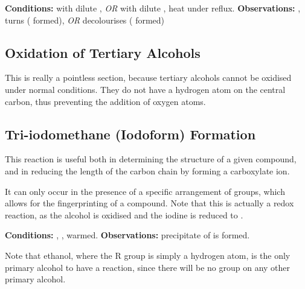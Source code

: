 			\vspace{1.5em}
			\vbox{\textbf{Conditions:}	\tabto{35mm} with dilute , \textit{OR}  with dilute ,
										\tabto{35mm}heat under reflux.}
			\vspace{0.75em}
			\vbox{\textbf{Observations:}\tabto{35mm} , turns 
													( formed), \textit{OR}
										\tabto{35mm}  decolourises ( formed)}



		\subsection{Oxidation of Tertiary Alcohols}

			This is really a pointless section, because tertiary alcohols cannot be oxidised under normal conditions. They do not have a hydrogen
			atom on the central carbon, thus preventing the addition of oxygen atoms.


		\pagebreak
		\subsection{Tri-iodomethane (Iodoform) Formation}

			This reaction is useful both in determining the structure of a given compound, and in reducing the length of the carbon chain by
			forming a carboxylate ion.

			It can only occur in the presence of a specific arrangement of groups, which allows for the fingerprinting of a compound. Note that
			this is actually a redox reaction, as the alcohol is oxidised and the iodine is reduced to .


			\vspace{1.5em}
			\vbox{\textbf{Conditions:}	\tabto{35mm}, , warmed.}
			\vbox{\textbf{Observations:}\tabto{35mm} precipitate of  is formed.}


			Note that ethanol, where the R group is simply a hydrogen atom, is the only primary alcohol to have a reaction, since there will
			be no  group on any other primary alcohol.






















